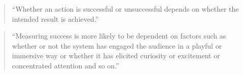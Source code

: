 \begin{quote}
  ``Whether an action is successful or unsuccessful depends on whether the intended result is achieved.'' \citep[p.23]{Candy2012}
\end{quote}

\begin{quote}
  ``Measuring success is more likely to be dependent on factors such as whether or not the system has engaged the audience in a playful or immersive way or whether it has elicited curiosity or excitement or concentrated attention and so on.'' \citep[p.23]{Candy2012}
\end{quote}



%
%
%
%
%
%
%
%
